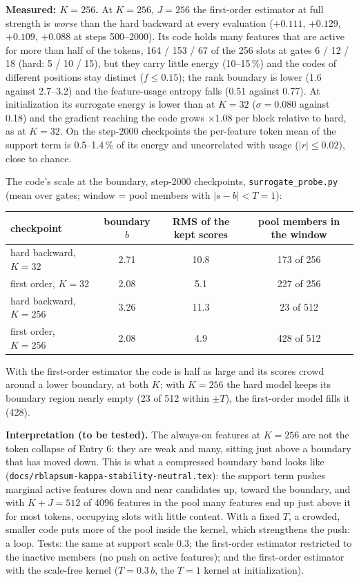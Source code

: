 \documentclass[11pt,a4paper]{article}
\newcommand{\code}[1]{\texttt{#1}}
\begin{document}
\textbf{Measured: \(K=256\).}  At \(K=256\), \(J=256\) the first-order estimator at full strength is \emph{worse} than
the hard backward at every evaluation (\(+0.111\), \(+0.129\), \(+0.109\), \(+0.088\) at steps 500--2000).  Its code holds many
features that are active for more than half of the tokens, 164 / 153 / 67 of the 256 slots at gates 6 / 12 / 18
(hard: 5 / 10 / 15), but they carry little energy (10--15\,\%) and the codes of different positions stay distinct
(\(f\le0.15\)); the rank boundary is lower (1.6 against 2.7--3.2) and the feature-usage entropy falls (0.51 against 0.77).
At initialization its surrogate energy is lower than at \(K=32\) (\(\sigma=0.080\) against 0.18) and the gradient
reaching the code grows \(\times1.08\) per block relative to hard, as at \(K=32\).  On the step-2000 checkpoints the
per-feature token mean of the support term is 0.5--1.4\,\% of its energy and uncorrelated with usage (\(|r|\le0.02\)),
close to chance.

The code's scale at the boundary, step-2000 checkpoints, \code{surrogate\_probe.py} (mean over gates; window =
pool members with \(|s-b|<T=1\)):

\begin{center}\small
\begin{tabular}{lccc}
\toprule
checkpoint & boundary \(b\) & RMS of the kept scores & pool members in the window \\
\midrule
hard backward, \(K=32\)          & 2.71 & 10.8 & 173 of 256 \\
first order, \(K=32\)            & 2.08 & 5.1  & 227 of 256 \\
hard backward, \(K=256\)         & 3.26 & 11.3 & 23 of 512 \\
first order, \(K=256\)           & 2.08 & 4.9  & 428 of 512 \\
\bottomrule
\end{tabular}
\end{center}

With the first-order estimator the code is half as large and its scores crowd around a lower boundary, at both
\(K\); with \(K=256\) the hard model keeps its boundary region nearly empty (23 of 512 within \(\pm T\)), the first-order
model fills it (428).

\textbf{Interpretation (to be tested).}  The always-on features at \(K=256\) are not the token collapse of Entry 6:
they are weak and many, sitting just above a boundary that has moved down.  This is what a compressed boundary
band looks like (\code{docs/rblapsum-kappa-stability-neutral.tex}): the support term pushes marginal active features
down and near candidates up, toward the boundary, and with \(K+J=512\) of 4096 features in the pool many features end
up just above it for most tokens, occupying slots with little content.  With a fixed \(T\), a crowded,
smaller code puts more of the pool inside the kernel, which strengthens the push: a loop.  Tests: the same at support
scale 0.3; the first-order estimator restricted to the inactive members (no push on active features); and the
first-order estimator with the scale-free kernel (\(T=0.3\,b\), the \(T=1\) kernel at initialization).
\end{document}
